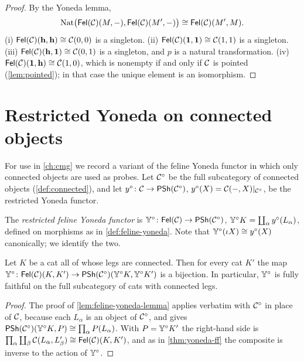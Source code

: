 \begin{proof}
By the Yoneda lemma,
\[
\mathrm{Nat}\bigl(\mathsf{Fel}(\mathcal{C})(M,-),\mathsf{Fel}(\mathcal{C})(M',-)\bigr)\cong\mathsf{Fel}(\mathcal{C})(M',M).
\]
(i) $\mathsf{Fel}(\mathcal{C})(\mathbf{h},\mathbf{h})\cong\mathcal{C}(0,0)$ is a singleton. (ii)
$\mathsf{Fel}(\mathcal{C})(\mathbf{1},\mathbf{1})\cong\mathcal{C}(1,1)$ is a singleton. (iii)
$\mathsf{Fel}(\mathcal{C})(\mathbf{h},\mathbf{1})\cong\mathcal{C}(0,1)$ is a singleton, and $p$ is a natural
transformation. (iv) $\mathsf{Fel}(\mathcal{C})(\mathbf{1},\mathbf{h})\cong\mathcal{C}(1,0)$, which is
nonempty if and only if $\mathcal{C}$ is pointed (\cref{lem:pointed}); in that case
the unique element is an isomorphism.
\end{proof}

\section{Restricted Yoneda on connected objects}\label{sec:restricted-yoneda}

For use in \cref{ch:cmg} we record a variant of the feline Yoneda functor in
which only connected objects are used as probes. Let $\mathcal{C}^{\circ}$ be the full
subcategory of connected objects (\cref{def:connected}), and let
$y^{\circ}\colon\mathcal{C}\to\mathsf{PSh}(\mathcal{C}^{\circ})$, $y^\circ(X)=\mathcal{C}(-,X)|_{\mathcal{C}^\circ}$,
be the restricted Yoneda functor.

\begin{definition}\label{def:restricted-yoneda}
The \emph{restricted feline Yoneda functor} is
$\mathbb{Y}^{\circ}\colon\mathsf{Fel}(\mathcal{C})\to\mathsf{PSh}(\mathcal{C}^\circ)$,
$\mathbb{Y}^\circ K=\coprod_\alpha y^\circ(L_\alpha)$, defined on morphisms as in
\cref{def:feline-yoneda}. Note that $\mathbb{Y}^\circ(\iota X)\cong y^\circ(X)$ canonically; we identify the two.
\end{definition}

\begin{proposition}\label{prop:restricted-yoneda}
Let $K$ be a cat all of whose legs are connected. Then for every cat $K'$ the
map $\mathbb{Y}^\circ\colon\mathsf{Fel}(\mathcal{C})(K,K')\to\mathsf{PSh}(\mathcal{C}^\circ)(\mathbb{Y}^\circ K,\mathbb{Y}^\circ K')$
is a bijection. In particular, $\mathbb{Y}^\circ$ is fully faithful on the full
subcategory of cats with connected legs.
\end{proposition}

\begin{proof}
The proof of \cref{lem:feline-yoneda-lemma} applies verbatim with $\mathcal{C}^\circ$ in
place of $\mathcal{C}$, because each $L_\alpha$ is an object of $\mathcal{C}^\circ$, and gives
$\mathsf{PSh}(\mathcal{C}^\circ)(\mathbb{Y}^\circ K,P)\cong\prod_\alpha P(L_\alpha)$. With
$P=\mathbb{Y}^\circ K'$ the right-hand side is
$\prod_\alpha\coprod_\beta\mathcal{C}(L_\alpha,L'_\beta)\cong\mathsf{Fel}(\mathcal{C})(K,K')$, and as in
\cref{thm:yoneda-ff} the composite is inverse to the action of $\mathbb{Y}^\circ$.
\end{proof}

